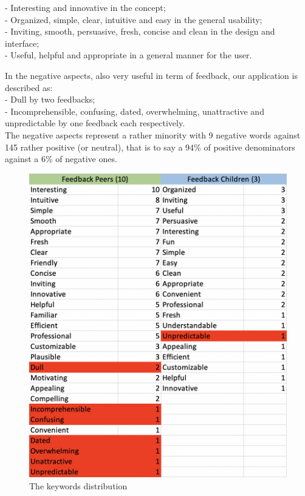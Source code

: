 \documentclass[12pt]{scrartcl}
\begin{document}
		- Interesting and innovative in the concept;\\
		
		- Organized, simple, clear, intuitive and easy in the general usability;\\
		
		- Inviting, smooth, persuasive, fresh, concise and clean in the design and interface;\\
		
		- Useful, helpful and appropriate in a general manner for the user.\\
		\newline		

	In the negative aspects, also very useful in term of feedback, our application is described as:\\
	
		- Dull by two feedbacks;\\
		
		- Incomprehensible, confusing, dated, overwhelming, unattractive and unpredictable by one feedback each respectively.\\

	The negative aspects represent a rather minority with 9 negative words against 145 rather positive (or neutral), that is to say a 94\% of positive denominators against a 6\% of negative ones. 


	\begin{figure}[H]
		\centering
		\includegraphics[width=\textwidth]{../images/gary_GA6_image_words_analysis.png}
		\caption{The keywords distribution}
		\label{words}
	\end{figure}
\end{document}
